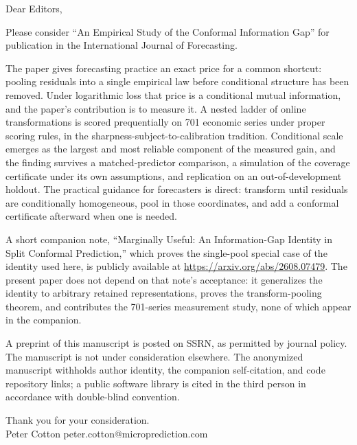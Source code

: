 \documentclass[11pt]{article}
\begin{document}
Dear Editors,

Please consider ``An Empirical Study of the Conformal Information Gap'' for publication in the International Journal of Forecasting.

The paper gives forecasting practice an exact price for a common shortcut: pooling residuals into a single empirical law before conditional structure has been removed. Under logarithmic loss that price is a conditional mutual information, and the paper's contribution is to measure it. A nested ladder of online transformations is scored prequentially on 701 economic series under proper scoring rules, in the sharpness-subject-to-calibration tradition. Conditional scale emerges as the largest and most reliable component of the measured gain, and the finding survives a matched-predictor comparison, a simulation of the coverage certificate under its own assumptions, and replication on an out-of-development holdout. The practical guidance for forecasters is direct: transform until residuals are conditionally homogeneous, pool in those coordinates, and add a conformal certificate afterward when one is needed.

A short companion note, ``Marginally Useful: An Information-Gap Identity in Split Conformal Prediction,'' which proves the single-pool special case of the identity used here, is publicly available at \url{https://arxiv.org/abs/2608.07479}. The present paper does not depend on that note's acceptance: it generalizes the identity to arbitrary retained representations, proves the transform-pooling theorem, and contributes the 701-series measurement study, none of which appear in the companion.

A preprint of this manuscript is posted on SSRN, as permitted by journal policy. The manuscript is not under consideration elsewhere. The anonymized manuscript withholds author identity, the companion self-citation, and code repository links; a public software library is cited in the third person in accordance with double-blind convention.

\vspace{6pt}
Thank you for your consideration.\\
Peter Cotton peter.cotton@microprediction.com
\end{document}
